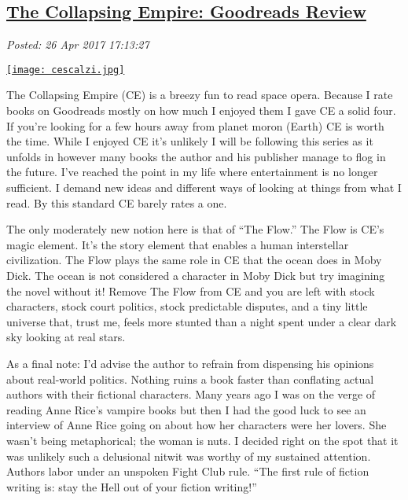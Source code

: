 %

\subsection*{\href{https://analyzethedatanotthedrivel.org/2017/04/26/the-collapsing-empire-goodreads-review/}{The Collapsing Empire: Goodreads Review}}


\noindent\emph{Posted: 26 Apr 2017 17:13:27}
\vspace{6pt}


\captionsetup[floatingfigure]{labelformat=empty}
\begin{floatingfigure}[r]{0.28\textwidth}
\centering
\href{https://www.goodreads.com/book/show/29939160-the-collapsing-empire}{\texttt{[image: cescalzi.jpg]}}
\label{fig:5368X0}
\end{floatingfigure}
The Collapsing Empire (CE) is a breezy fun to read space opera. Because I
rate books on Goodreads mostly on how much I enjoyed them I gave CE a
solid four. If you're looking for a few hours away from planet moron
(Earth) CE is worth the time. While I enjoyed CE it's unlikely I will be
following this series as it unfolds in however many books the author and
his publisher manage to flog in the future. I've reached the point in my
life where entertainment is no longer sufficient. I demand new ideas and
different ways of looking at things from what I read. By this standard
CE barely rates a one.

The only moderately new notion here is that of ``The Flow.'' The Flow is
CE's magic element. It's the story element that enables a human
interstellar civilization. The Flow plays the same role in CE that the
ocean does in Moby Dick. The ocean is not considered a character in Moby
Dick but try imagining the novel without it! Remove The Flow from CE and
you are left with stock characters, stock court politics, stock
predictable disputes, and a tiny little universe that, trust me, feels
more stunted than a night spent under a clear dark sky looking at real
stars.

As a final note: I'd advise the author to refrain from dispensing his
opinions about real-world politics. Nothing ruins a book faster than
conflating actual authors with their fictional characters. Many years
ago I was on the verge of reading Anne Rice's vampire books but then I
had the good luck to see an interview of Anne Rice going on about how
her characters were her lovers. She wasn't being metaphorical; the woman
is nuts. I decided right on the spot that it was unlikely such a
delusional nitwit was worthy of my sustained attention. Authors labor
under an unspoken Fight Club rule. ``The first rule of fiction writing
is: stay the Hell out of your fiction writing!''



%